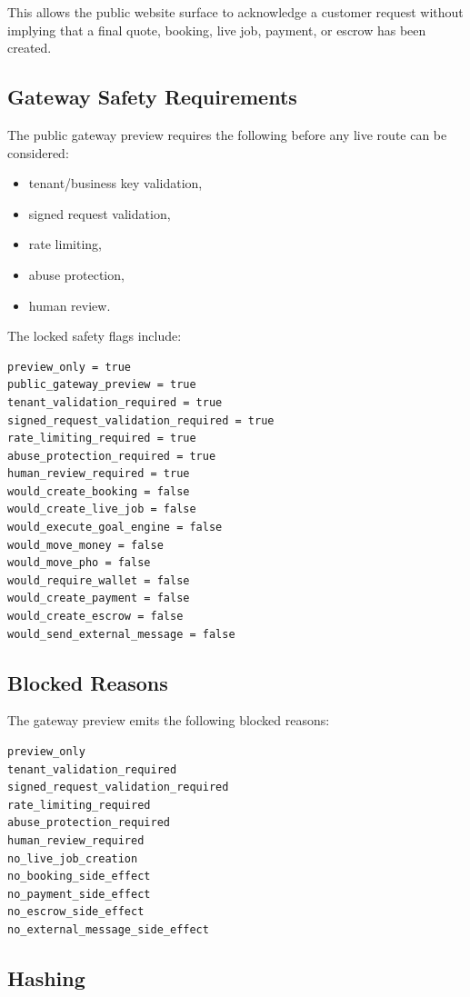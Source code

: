 This allows the public website surface to acknowledge a customer request without implying that a final quote, booking, live job, payment, or escrow has been created.

\subsection{Gateway Safety Requirements}

The public gateway preview requires the following before any live route can be considered:

\begin{itemize}
  \item tenant/business key validation,
  \item signed request validation,
  \item rate limiting,
  \item abuse protection,
  \item human review.
\end{itemize}

The locked safety flags include:

\begin{verbatim}
preview_only = true
public_gateway_preview = true
tenant_validation_required = true
signed_request_validation_required = true
rate_limiting_required = true
abuse_protection_required = true
human_review_required = true
would_create_booking = false
would_create_live_job = false
would_execute_goal_engine = false
would_move_money = false
would_move_pho = false
would_require_wallet = false
would_create_payment = false
would_create_escrow = false
would_send_external_message = false
\end{verbatim}

\subsection{Blocked Reasons}

The gateway preview emits the following blocked reasons:

\begin{verbatim}
preview_only
tenant_validation_required
signed_request_validation_required
rate_limiting_required
abuse_protection_required
human_review_required
no_live_job_creation
no_booking_side_effect
no_payment_side_effect
no_escrow_side_effect
no_external_message_side_effect
\end{verbatim}

\subsection{Hashing}

